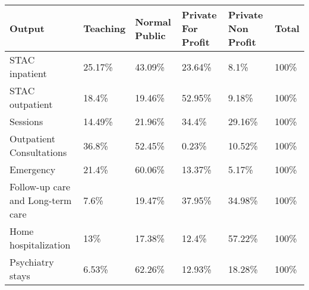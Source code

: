 \begin{tabular}{llllll}
  \toprule
  Output                            & Teaching & Normal Public & Private For Profit & Private Non Profit & Total \\
  \midrule
  STAC inpatient                    & 25.17\%  & 43.09\%       & 23.64\%            & 8.1\%              & 100\% \\
  STAC outpatient                   & 18.4\%   & 19.46\%       & 52.95\%            & 9.18\%             & 100\% \\
  Sessions                          & 14.49\%  & 21.96\%       & 34.4\%             & 29.16\%            & 100\% \\
  Outpatient Consultations          & 36.8\%   & 52.45\%       & 0.23\%             & 10.52\%            & 100\% \\
  Emergency                         & 21.4\%   & 60.06\%       & 13.37\%            & 5.17\%             & 100\% \\
  Follow-up care and Long-term care & 7.6\%    & 19.47\%       & 37.95\%            & 34.98\%            & 100\% \\
  Home hospitalization              & 13\%     & 17.38\%       & 12.4\%             & 57.22\%            & 100\% \\
  Psychiatry stays                  & 6.53\%   & 62.26\%       & 12.93\%            & 18.28\%            & 100\% \\
  \bottomrule
\end{tabular}
